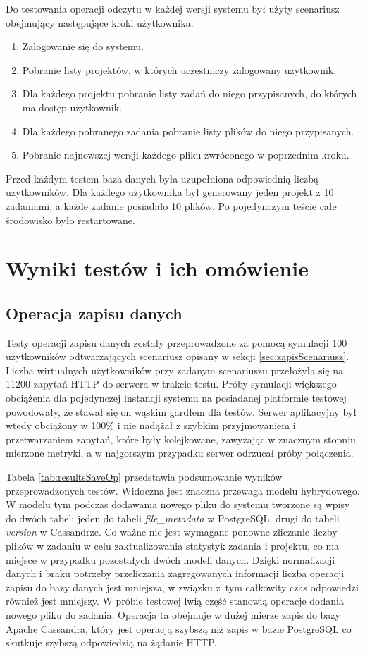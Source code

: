Do testowania operacji odczytu w każdej wersji systemu był użyty scenariusz obejmujący następujące kroki użytkownika:
\begin{enumerate}
    \item Zalogowanie się do systemu.
    \item Pobranie listy projektów, w których uczestniczy zalogowany użytkownik.
    \item Dla każdego projektu pobranie listy zadań do niego przypisanych, do których ma dostęp użytkownik.
    \item Dla każdego pobranego zadania pobranie listy plików do niego przypisanych.
    \item Pobranie najnowszej wersji każdego pliku zwróconego w poprzednim kroku.
\end{enumerate}
Przed każdym testem baza danych była uzupełniona odpowiednią liczbą użytkowników.
Dla każdego użytkownika był generowany jeden projekt z 10 zadaniami, a każde zadanie posiadało 10 plików.
Po pojedynczym teście całe środowisko było restartowane.

\section{Wyniki testów i ich omówienie}

\subsection{Operacja zapisu danych}

Testy operacji zapisu danych zostały przeprowadzone za pomocą symulacji 100 użytkowników odtwarzających scenariusz opisany w sekcji \ref{sec:zapisScenariusz}.
Liczba wirtualnych użytkowników przy zadanym scenariuszu przełożyła się na 11200 zapytań HTTP do serwera w trakcie testu.
Próby symulacji większego obciążenia dla pojedynczej instancji systemu na posiadanej platformie testowej powodowały, że stawał się on wąskim gardłem dla testów.
Serwer aplikacyjny był wtedy obciążony w 100\% i nie nadążał z szybkim przyjmowaniem i przetwarzaniem zapytań, które były kolejkowane, zawyżając w znacznym stopniu mierzone metryki, a w najgorszym przypadku serwer odrzucał próby połączenia.

Tabela \ref{tab:resultsSaveOp} przedstawia podsumowanie wyników przeprowadzonych testów.
Widoczna jest znaczna przewaga modelu hybrydowego. 
W modelu tym podczas dodawania nowego pliku do systemu tworzone są wpisy do dwóch tabel: jeden do tabeli \textit{file\_metadata} w PostgreSQL, drugi do tabeli \textit{version} w Cassandrze.
Co ważne nie jest wymagane ponowne zliczanie liczby plików w zadaniu w celu zaktualizowania statystyk zadania i projektu, co ma miejsce w przypadku pozostałych dwóch modeli danych.
Dzięki normalizacji danych i braku potrzeby przeliczania zagregowanych informacji liczba operacji zapisu do bazy danych jest mniejsza, w związku z~tym całkowity czas odpowiedzi również jest mniejszy.
W próbie testowej lwią część stanowią operacje dodania nowego pliku do zadania. 
Operacja ta obejmuje w dużej mierze zapis do bazy Apache Cassandra, który jest operacją szybszą niż zapis w bazie PostgreSQL co skutkuje szybszą odpowiedzią na żądanie HTTP. 

